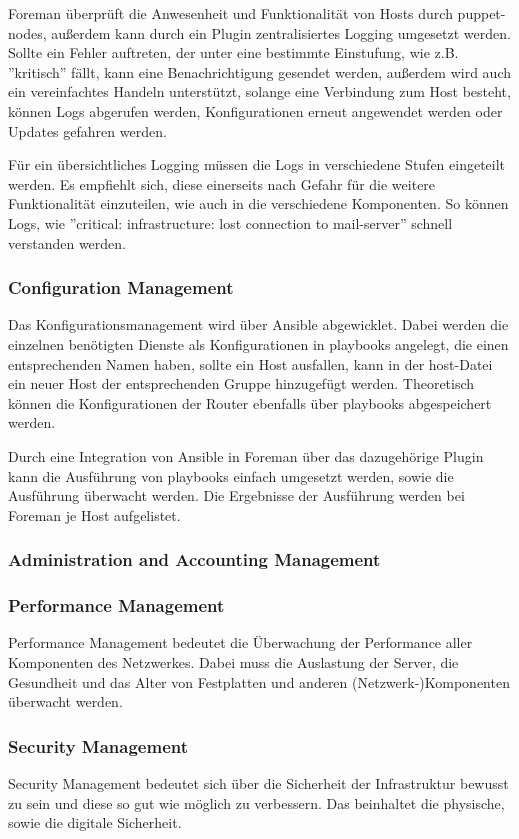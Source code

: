 \documentclass[a4paper]{article}
\begin{document}
Foreman überprüft die Anwesenheit und Funktionalität von Hosts durch puppet-nodes, außerdem kann durch ein Plugin zentralisiertes Logging umgesetzt werden. Sollte ein Fehler auftreten, der unter eine bestimmte Einstufung, wie z.B. ''kritisch'' fällt, kann eine Benachrichtigung gesendet werden, außerdem wird auch ein vereinfachtes Handeln unterstützt, solange eine Verbindung zum Host besteht, können Logs abgerufen werden, Konfigurationen erneut angewendet werden oder Updates gefahren werden.

Für ein übersichtliches Logging müssen die Logs in verschiedene Stufen eingeteilt werden. Es empfiehlt sich, diese einerseits nach Gefahr für die weitere Funktionalität einzuteilen, wie auch in die verschiedene Komponenten. So können Logs, wie ''critical: infrastructure: lost connection to mail-server'' schnell verstanden werden.

\subsubsection{Configuration Management}
Das Konfigurationsmanagement wird über Ansible abgewicklet. Dabei werden die einzelnen benötigten Dienste als Konfigurationen in playbooks angelegt, die einen entsprechenden Namen haben, sollte ein Host ausfallen, kann in der host-Datei ein neuer Host der entsprechenden Gruppe hinzugefügt werden. Theoretisch können die Konfigurationen der Router ebenfalls über playbooks abgespeichert werden. 

Durch eine Integration von Ansible in Foreman über das dazugehörige Plugin kann die Ausführung von playbooks einfach umgesetzt werden, sowie die Ausführung überwacht werden. Die Ergebnisse der Ausführung werden bei Foreman je Host aufgelistet.

\subsubsection{Administration and Accounting Management}

\subsubsection{Performance Management}
Performance Management bedeutet die Überwachung der Performance aller Komponenten des Netzwerkes. Dabei muss die Auslastung der Server, die Gesundheit und das Alter von Festplatten und anderen (Netzwerk-)Komponenten überwacht werden.

\subsubsection{Security Management}
Security Management bedeutet sich über die Sicherheit der Infrastruktur bewusst zu sein und diese so gut wie möglich zu verbessern. Das beinhaltet die physische, sowie die digitale Sicherheit.
\end{document}
